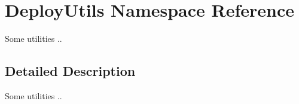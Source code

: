 \hypertarget{namespace_deploy_utils}{}\section{Deploy\+Utils Namespace Reference}
\label{namespace_deploy_utils}


Some utilities ..  




\subsection{Detailed Description}
Some utilities .. 